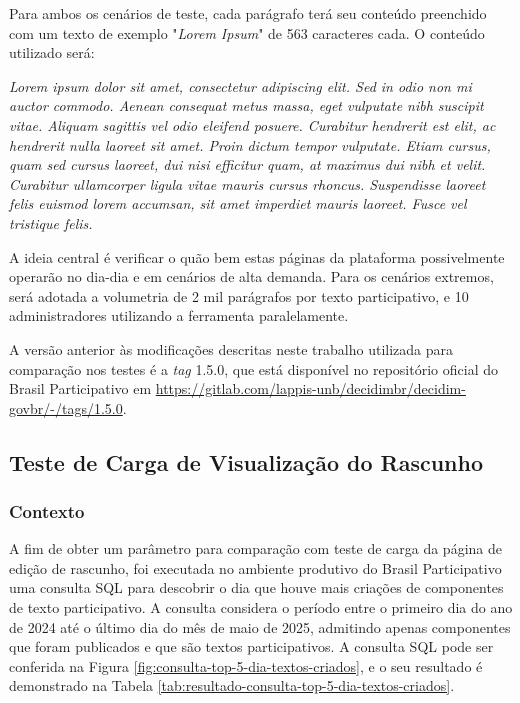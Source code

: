 Para ambos os cenários de teste, cada parágrafo terá seu conteúdo preenchido com um texto de exemplo "\textit{Lorem Ipsum}" de 563 caracteres cada. O conteúdo utilizado será:

\textit{Lorem ipsum dolor sit amet, consectetur adipiscing elit. Sed in odio non mi auctor commodo. Aenean consequat metus massa, eget vulputate nibh suscipit vitae. Aliquam sagittis vel odio eleifend posuere. Curabitur hendrerit est elit, ac hendrerit nulla laoreet sit amet. Proin dictum tempor vulputate. Etiam cursus, quam sed cursus laoreet, dui nisi efficitur quam, at maximus dui nibh et velit. Curabitur ullamcorper ligula vitae mauris cursus rhoncus. Suspendisse laoreet felis euismod lorem accumsan, sit amet imperdiet mauris laoreet. Fusce vel tristique felis.}

A ideia central é verificar o quão bem estas páginas da plataforma possivelmente operarão no dia-dia e em cenários de alta demanda.
Para os cenários extremos, será adotada a volumetria de 2 mil parágrafos por texto participativo, e 10 administradores utilizando a ferramenta paralelamente.

A versão anterior às modificações descritas neste trabalho utilizada para comparação nos testes é a \textit{tag} 1.5.0, que está disponível no repositório oficial do Brasil Participativo em \url{https://gitlab.com/lappis-unb/decidimbr/decidim-govbr/-/tags/1.5.0}.

\subsection {Teste de Carga de Visualização do Rascunho}

\subsubsection {Contexto}

A fim de obter um parâmetro para comparação com teste de carga da página de edição de rascunho, foi executada no ambiente produtivo do Brasil Participativo uma consulta SQL para descobrir o dia que houve mais criações de componentes de texto participativo. A consulta considera o período entre o primeiro dia do ano de 2024 até o último dia do mês de maio de 2025, admitindo apenas componentes que foram publicados e que são textos participativos. A consulta SQL pode ser conferida na Figura \ref{fig:consulta-top-5-dia-textos-criados}, e o seu resultado é demonstrado na Tabela \ref{tab:resultado-consulta-top-5-dia-textos-criados}.

